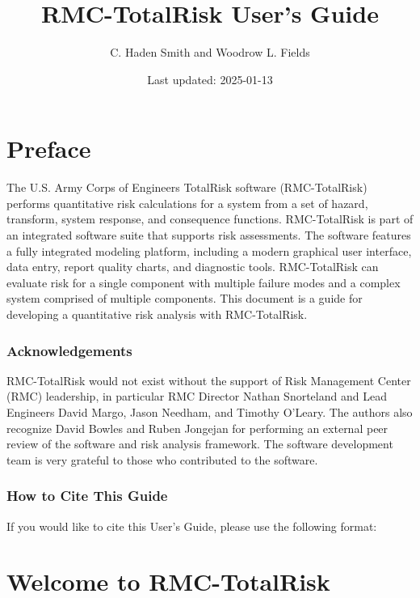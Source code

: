 \documentclass[
]{book}
\title{RMC-TotalRisk User's Guide}
\author{C. Haden Smith and Woodrow L. Fields}
\date{Last updated: 2025-01-13}
\begin{document}
\maketitle

{
\setcounter{tocdepth}{1}
\tableofcontents
}
\hypertarget{preface}{%
\chapter*{Preface}\label{preface}}

The U.S. Army Corps of Engineers TotalRisk software (RMC-TotalRisk) performs quantitative risk calculations for a system from a set of hazard, transform, system response, and consequence functions. RMC-TotalRisk is part of an integrated software suite that supports risk assessments. The software features a fully integrated modeling platform, including a modern graphical user interface, data entry, report quality charts, and diagnostic tools. RMC-TotalRisk can evaluate risk for a single component with multiple failure modes and a complex system comprised of multiple components. This document is a guide for developing a quantitative risk analysis with RMC-TotalRisk.

\hypertarget{acknowledgements}{%
\subsection*{Acknowledgements}\label{acknowledgements}}

RMC-TotalRisk would not exist without the support of Risk Management Center (RMC) leadership, in particular RMC Director Nathan Snorteland and Lead Engineers David Margo, Jason Needham, and Timothy O'Leary. The authors also recognize David Bowles and Ruben Jongejan for performing an external peer review of the software and risk analysis framework. The software development team is very grateful to those who contributed to the software.

\hypertarget{how-to-cite-this-guide}{%
\subsection*{How to Cite This Guide}\label{how-to-cite-this-guide}}

If you would like to cite this User's Guide, please use the following format:

\hypertarget{welcome}{%
\chapter{Welcome to RMC-TotalRisk}\label{welcome}}
\end{document}
